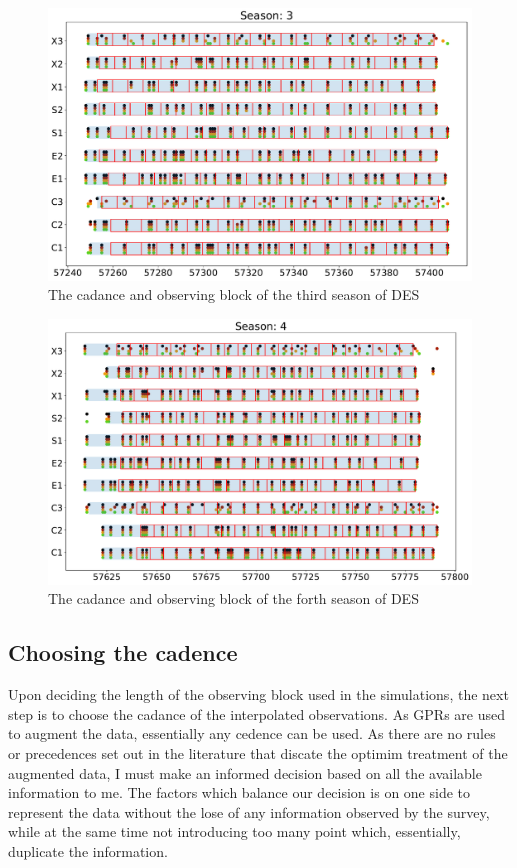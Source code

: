 \begin{figure}[h]
\includegraphics[width=\textwidth]{Figures/Chapter5/ObsBlock_Season3.pdf}
  \caption{The cadance and observing block of the third season of DES}
  \label{fig:ObsBlock3}
\end{figure}

\begin{figure}[h]
  \includegraphics[width=\textwidth]{Figures/Chapter5/ObsBlock_Season4.pdf}
  \caption{The cadance and observing block of the forth season of DES}
  \label{fig:ObsBlock4}
\end{figure}

\subsection{Choosing the cadence} \label{sec:SimCadance}
Upon deciding the length of the observing block used in the simulations, the next step is to choose the cadance of the interpolated observations. As GPRs are used to augment the data, essentially any cedence can be used. As there are no rules or precedences set out in the literature that discate the optimim treatment of the augmented data, I must make an informed decision based on all the available information to me. The factors which balance our decision is on one side to represent the data without the lose of any information observed by the survey, while at the same time not introducing too many point which, essentially, duplicate the information.

